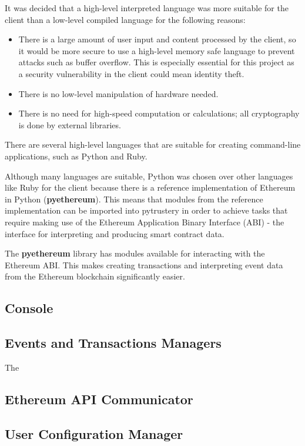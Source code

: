 \documentclass[12pt,a4paper]{report}
\begin{document}
	It was decided that a high-level interpreted language was more suitable for the client than a low-level compiled language for the following reasons:
	\begin{itemize}
		\item There is a large amount of user input and content processed by the client, so it would be more secure to use a high-level memory safe language to prevent attacks such as buffer overflow. This is especially essential for this project as a security vulnerability in the client could mean identity theft.
		\item There is no low-level manipulation of hardware needed.
		\item There is no need for high-speed computation or calculations; all cryptography is done by external libraries.
	\end{itemize}
	
	There are several high-level languages that are suitable for creating command-line applications, such as Python and Ruby.
	
	Although many languages are suitable, Python was chosen over other languages like Ruby for the client because there is a reference implementation of Ethereum in Python (\textbf{pyethereum}).\cite{16} This means that modules from the reference implementation can be imported into pytrustery in order to achieve tasks that require making use of the Ethereum Application Binary Interface (ABI)\cite{14} - the interface for interpreting and producing smart contract data.
	
	The \textbf{pyethereum} library has modules available for interacting with the Ethereum ABI. This makes creating transactions and interpreting event data from the Ethereum blockchain significantly easier.
	
	\subsection{Console}
	
	\subsection{Events and Transactions Managers}
	The
	
	\subsection{Ethereum API Communicator}
	
	\subsection{User Configuration Manager}
	
\end{document}
